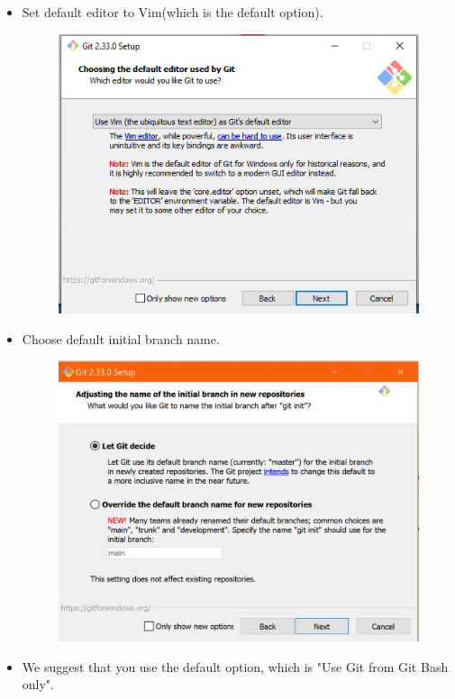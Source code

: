 \documentclass[10pt]{article} %
\begin{document}
\begin{itemize}
    	\pagebreak

        \item Set default editor to Vim(which is the default option).

        \begin{figure}[h!]
          \centering
          \includegraphics[width=0.65\linewidth]{figs/git1}
          \caption{}
          \label{fig:gitbash4}
        \end{figure}

    	\item Choose default initial branch name.

    	\begin{figure}[h!]
    		\centering
    		\includegraphics[width=0.7\linewidth]{figs/GitBash14_master}
    		\caption{}
    		\label{fig:gitbash14_master}
    	\end{figure}

    	\pagebreak

        \item We suggest that you use the default option, which is "Use Git from Git Bash only".


\end{itemize}
\end{document}
